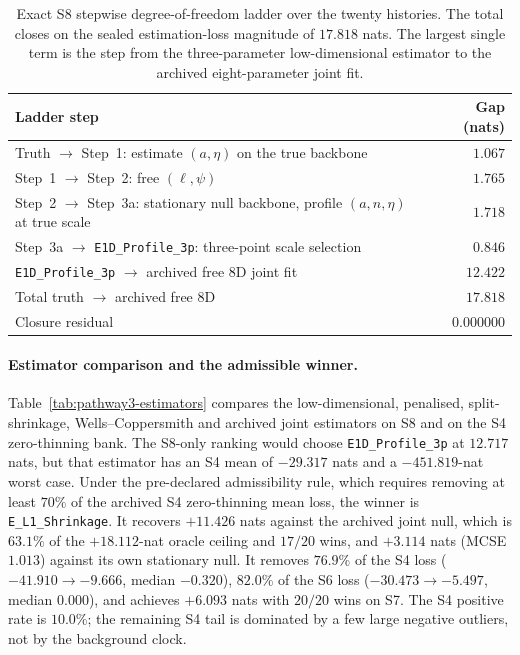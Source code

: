 \begin{table}[htbp]\centering\small
\begin{tabular}{@{}lr@{}}\toprule
Ladder step & Gap (nats)\\\midrule
Truth $\to$ Step~1: estimate $(a,\eta)$ on the true backbone & $1.067$\\
Step~1 $\to$ Step~2: free $(\ell,\psi)$ & $1.765$\\
Step~2 $\to$ Step~3a: stationary null backbone, profile $(a,n,\eta)$ at true scale & $1.718$\\
Step~3a $\to$ \texttt{E1D\_Profile\_3p}: three-point scale selection & $0.846$\\
\texttt{E1D\_Profile\_3p} $\to$ archived free 8D joint fit & $12.422$\\\midrule
Total truth $\to$ archived free 8D & $17.818$\\
Closure residual & $0.000000$\\
\bottomrule\end{tabular}
\caption{Exact S8 stepwise degree-of-freedom ladder over the twenty histories. The total closes on the sealed estimation-loss magnitude of $17.818$ nats. The largest single term is the step from the three-parameter low-dimensional estimator to the archived eight-parameter joint fit.}
\label{tab:pathway3-ladder}
\end{table}

\paragraph{Estimator comparison and the admissible winner.}
Table~\ref{tab:pathway3-estimators} compares the low-dimensional, penalised, split-shrinkage, Wells--Coppersmith and archived joint estimators on S8 and on the S4 zero-thinning bank. The S8-only ranking would choose \texttt{E1D\_Profile\_3p} at $12.717$ nats, but that estimator has an S4 mean of $-29.317$ nats and a $-451.819$-nat worst case. Under the pre-declared admissibility rule, which requires removing at least $70\%$ of the archived S4 zero-thinning mean loss, the winner is \texttt{E\_L1\_Shrinkage}. It recovers $+11.426$ nats against the archived joint null, which is $63.1\%$ of the $+18.112$-nat oracle ceiling and $17/20$ wins, and $+3.114$ nats (MCSE $1.013$) against its own stationary null. It removes $76.9\%$ of the S4 loss ($-41.910\to -9.666$, median $-0.320$), $82.0\%$ of the S6 loss ($-30.473\to -5.497$, median $0.000$), and achieves $+6.093$ nats with $20/20$ wins on S7. The S4 positive rate is $10.0\%$; the remaining S4 tail is dominated by a few large negative outliers, not by the background clock.

